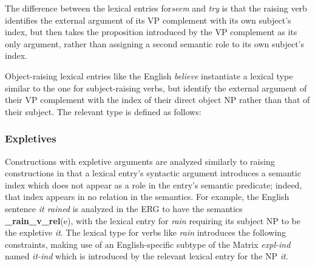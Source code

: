 \documentclass[12pt]{article}
\newcommand{\avmplus}[1]{{\setlength{\arraycolsep}{0.8mm}
                       \renewcommand{\arraystretch}{1.1} %
                       \left[
                       \begin{array}{l}
                       \\[-2mm] #1 \\[-2mm] \\
                       \end{array}
                       \right]
                    }}
\newcommand{\att}[1]{{\mbox{\scriptsize {\bf #1}}}}
\newcommand{\attval}[2]{{\mbox{\scriptsize #1}\ {{#2}}}}
\newcommand{\attvallist}[2]{{\mbox{\scriptsize #1}\ {<{#2}>}}}
\newcommand{\ind}[1]{{\setlength{\fboxsep}{0.25mm} \: \fbox{{\small #1}} \:}}
\begin{document}
The difference between the lexical entries for{\it seem} and {\it try} is
that the raising verb identifies the external argument of its VP complement
with its own subject's index, but then takes the proposition introduced by
the VP complement as its only argument, rather than assigning a second
semantic role to its own subject's index.

Object-raising lexical entries like the English {\it believe} instantiate
a lexical type similar to the one for subject-raising verbs, but identify
the external argument of their VP complement with the index of their direct
object NP rather than that of their subject.  The relevant type is defined
as follows:

\subsubsection{Expletives}

Constructions with expletive arguments are analyzed similarly to raising
constructions in that a lexical entry's syntactic argument introduces a
semantic index which does not appear as a role in the entry's semantic
predicate; indeed, that index appears in no relation in the semantics.
For example, the English sentence {\it it rained} is analyzed in the ERG
to have the semantics {\bf \_rain\_v\_rel}(e), with the lexical entry for
{\it rain} requiring its subject NP to be the expletive {\it it}.  The
lexical type for verbs like {\it rain} introduces the following constraints,
making use of an English-specific subtype of the Matrix {\it expl-ind} named
{\it it-ind} which is introduced by the relevant lexical entry for the NP
{\it it}.
\end{document}
